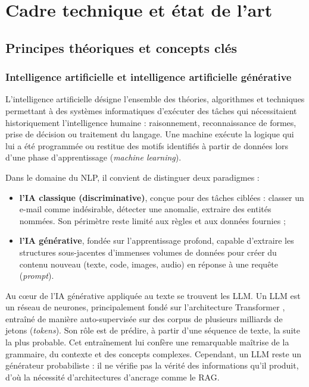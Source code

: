 \documentclass[12pt,a4paper,oneside]{report}
\begin{document}
\chapter{Cadre technique et état de l'art}

\section{Principes théoriques et concepts clés}

\subsection{Intelligence artificielle et intelligence artificielle générative}

L'intelligence artificielle désigne l'ensemble des théories, algorithmes et techniques permettant à des systèmes informatiques d'exécuter des tâches qui nécessitaient historiquement l'intelligence humaine : raisonnement, reconnaissance de formes, prise de décision ou traitement du langage. Une machine exécute la logique qui lui a été programmée ou restitue des motifs identifiés à partir de données lors d'une phase d'apprentissage (\emph{machine learning}).

Dans le domaine du NLP, il convient de distinguer deux paradigmes :
\begin{itemize}
  \item \textbf{l'IA classique (discriminative)}, conçue pour des tâches ciblées : classer un e-mail comme indésirable, détecter une anomalie, extraire des entités nommées. Son périmètre reste limité aux règles et aux données fournies ;
  \item \textbf{l'IA générative}, fondée sur l'apprentissage profond, capable d'extraire les structures sous-jacentes d'immenses volumes de données pour créer du contenu nouveau (texte, code, images, audio) en réponse à une requête (\emph{prompt}).
\end{itemize}

Au cœur de l'IA générative appliquée au texte se trouvent les LLM. Un LLM est un réseau de neurones, principalement fondé sur l'architecture Transformer \cite{vaswani2017attention}, entraîné de manière auto-supervisée sur des corpus de plusieurs milliards de jetons (\emph{tokens}). Son rôle est de prédire, à partir d'une séquence de texte, la suite la plus probable. Cet entraînement lui confère une remarquable maîtrise de la grammaire, du contexte et des concepts complexes. Cependant, un LLM reste un générateur probabiliste : il ne vérifie pas la vérité des informations qu'il produit, d'où la nécessité d'architectures d'ancrage comme le RAG.
\end{document}
